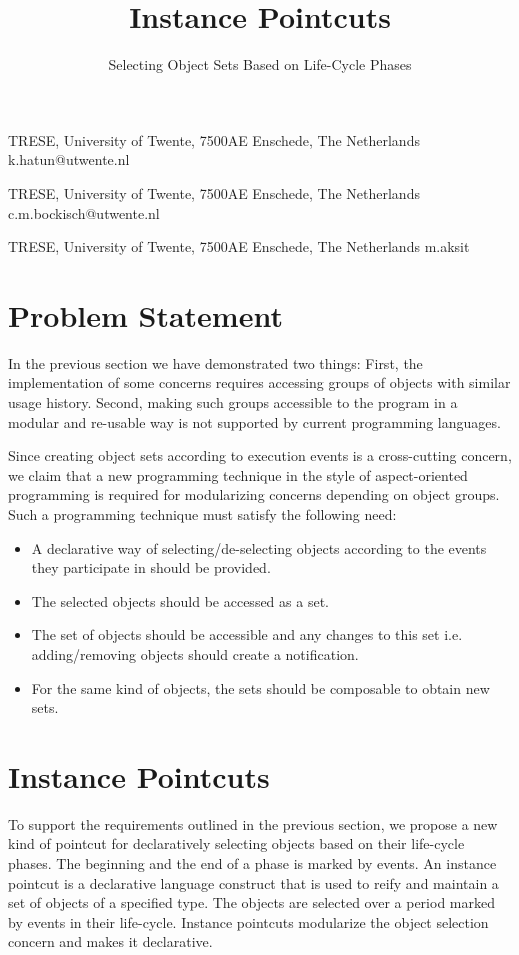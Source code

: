 \documentclass[10pt]{sigplanconf}
\begin{document}
\title{Instance Pointcuts}
\subtitle{Selecting Object Sets Based on Life-Cycle Phases}


{TRESE, University of Twente, 7500AE Enschede, The Netherlands}
{k.hatun@utwente.nl}

{TRESE, University of Twente, 7500AE Enschede, The Netherlands}
{c.m.bockisch@utwente.nl}

{TRESE, University of Twente, 7500AE Enschede, The Netherlands}
{m.aksit}




\section{Problem Statement}
\label{sec:problem-statement}

In the previous section we have demonstrated two things: First, the implementation of some concerns requires accessing groups of objects with similar usage history.
Second, making such groups accessible to the program in a modular and re-usable way is not supported by current programming languages.

Since creating object sets according to execution events is a cross-cutting concern, we claim that a new programming technique in the style of aspect-oriented programming is required for modularizing concerns depending on object groups.
Such a programming technique must satisfy the following need:

\begin{itemize}
\item A declarative way of selecting/de-selecting objects according to the events they participate in should be provided.
\item The selected objects should be accessed as a set.
\item The set of objects should be accessible and any changes to this set i.e. adding/removing objects should create a notification.
\item For the same kind of objects, the sets should be composable to obtain new sets.
\end{itemize}

\section{Instance Pointcuts}
\label{sect:ip}
To support the requirements outlined in the previous section, we propose a new kind of pointcut for declaratively selecting objects based on their life-cycle phases. The beginning and the end of a phase is marked by events.
An instance pointcut is a declarative language construct that is used to reify and maintain a set of objects of a specified type. The objects are selected over a period marked by events in their life-cycle. Instance pointcuts modularize the object selection concern and makes it declarative.
\end{document}
